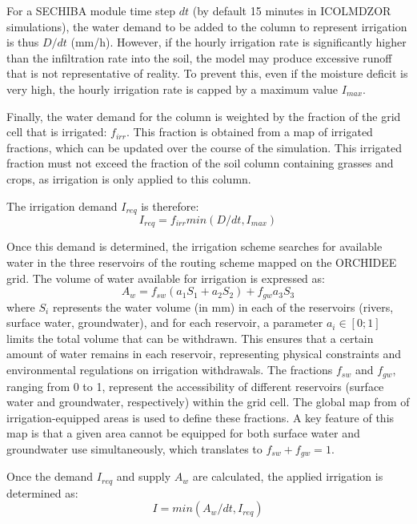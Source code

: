 For a SECHIBA module time step $dt$ (by default 15 minutes in ICOLMDZOR simulations), the water demand to be added to the column to represent irrigation is thus $D/dt$ (mm/h). However, if the hourly irrigation rate is significantly higher than the infiltration rate into the soil, the model may produce excessive runoff that is not representative of reality. To prevent this, even if the moisture deficit is very high, the hourly irrigation rate is capped by a maximum value $I_{max}$.

Finally, the water demand for the column is weighted by the fraction of the grid cell that is irrigated: $f_{irr}$. This fraction is obtained from a map of irrigated fractions, which can be updated over the course of the simulation.
This irrigated fraction must not exceed the fraction of the soil column containing grasses and crops, as irrigation is only applied to this column.

The irrigation demand $I_{req}$ is therefore:
\begin{equation}
    I_{req} = f_{irr} min(D/dt, I_{max})
\end{equation}

Once this demand is determined, the irrigation scheme searches for available water in the three reservoirs of the routing scheme mapped on the ORCHIDEE grid.
The volume of water available for irrigation is expressed as:
\begin{equation}
    A_w = f_{sw} (a_1 S_1 + a_2 S_2)+ f_{gw}a_3 S_3
\end{equation}
where $S_i$ represents the water volume (in mm) in each of the reservoirs (rivers, surface water, groundwater), and for each reservoir, a parameter $a_i \in [0;1]$ limits the total volume that can be withdrawn. This ensures that a certain amount of water remains in each reservoir, representing physical constraints and environmental regulations on irrigation withdrawals.
The fractions $f_{sw}$ and $f_{gw}$, ranging from 0 to 1, represent the accessibility of different reservoirs (surface water and groundwater, respectively) within the grid cell. The global map from \citet{siebert_groundwater_2010} of irrigation-equipped areas is used to define these fractions. A key feature of this map is that a given area cannot be equipped for both surface water and groundwater use simultaneously, which translates to $f_{sw} + f_{gw} =1$.

Once the demand $I_{req}$ and supply $A_w$ are calculated, the applied irrigation is determined as:
\begin{equation}
    I = min(A_w/dt, I_{req})
\end{equation}

